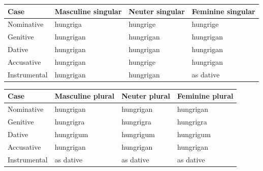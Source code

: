 \par\begingroup
\fontsize{10.5}{13.2}\selectfont
\setlength{\LTleft}{0pt}\setlength{\LTright}{\fill}
\noindent
\begin{tabular}{@{}>{\raggedright\arraybackslash}p{22.0mm}>{\raggedright\arraybackslash}p{31.188mm}>{\raggedright\arraybackslash}p{31.188mm}>{\raggedright\arraybackslash}p{31.188mm}@{}}
\toprule
\textbf{Case} & \textbf{Masculine singular} & \textbf{Neuter singular} & \textbf{Feminine singular} \\
\midrule
Nominative & hungriga & hungrige & hungrige \\
Genitive & hungrigan & hungrigan & hungrigan \\
Dative & hungrigan & hungrigan & hungrigan \\
Accusative & hungrigan & hungrige & hungrigan \\
Instrumental & hungrigan & hungrigan & as dative \\
\bottomrule
\end{tabular}
\par\endgroup
\par\addvspace{5pt}
\par\begingroup
\fontsize{10.5}{13.2}\selectfont
\setlength{\LTleft}{0pt}\setlength{\LTright}{\fill}
\noindent
\begin{tabular}{@{}>{\raggedright\arraybackslash}p{22.0mm}>{\raggedright\arraybackslash}p{31.188mm}>{\raggedright\arraybackslash}p{31.188mm}>{\raggedright\arraybackslash}p{31.188mm}@{}}
\toprule
\textbf{Case} & \textbf{Masculine plural} & \textbf{Neuter plural} & \textbf{Feminine plural} \\
\midrule
Nominative & hungrigan & hungrigan & hungrigan \\
Genitive & hungrigra & hungrigra & hungrigra \\
Dative & hungrigum & hungrigum & hungrigum \\
Accusative & hungrigan & hungrigan & hungrigan \\
Instrumental & as dative & as dative & as dative \\
\bottomrule
\end{tabular}
\par\endgroup

